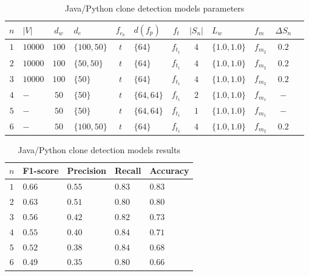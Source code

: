 \begin{table}
  \caption{\label{tab:java-python-model-params}Java/Python clone detection
    models parameters}
  \begin{center}
    \begin{tabularx}{\linewidth}{c Y c Y c Y c c Y Y c c}
      \toprule
      $n$ & $|V|$ & $d_w$ & $d_e$ & $f_{e_b}$ & $d(f_p)$ & $f_t$ & $|S_n|$ & $L_w$ & $f_m$ & $\Delta S_n$\\
      \toprule
      $1$ & $10000$ & $100$ & $\{100,50\}$ & $t$ & $\{64\}$ & $f_{t_1}$ & $4$ & $\{1.0,1.0\}$ & $f_{m_2}$ & $0.2$\\
      $2$ & $10000$ & $100$ & $\{50,50\}$ & $t$ & $\{64\}$ & $f_{t_1}$ & $4$ & $\{1.0,1.0\}$ & $f_{m_2}$ & $0.2$\\
      $3$ & $10000$ & $100$ & $\{50\}$ & $t$ & $\{64\}$ & $f_{t_1}$ & $4$ & $\{1.0,1.0\}$ & $f_{m_2}$ & $0.2$\\
      $4$ & $-$ & $50$ & $\{50\}$ & $t$ & $\{64,64\}$ & $f_{t_1}$ & $2$ & $\{1.0,1.0\}$ & $f_{m_1}$ & $-$\\
      $5$ & $-$ & $50$ & $\{50\}$ & $t$ & $\{64,64\}$ & $f_{t_1}$ & $1$ & $\{1.0,1.0\}$ & $f_{m_1}$ & $-$\\
      $6$ & $-$ & $50$ & $\{100,50\}$ & $t$ & $\{64\}$ & $f_{t_1}$ & $4$ & $\{1.0,1.0\}$ & $f_{m_2}$ & $0.2$\\
      \bottomrule
    \end{tabularx}
  \end{center}
\end{table}
%
\begin{table}
  \caption{\label{tab:java-python-model-results}Java/Python clone detection
    models results}
  \begin{center}
    \begin{tabularx}{\linewidth}{c Y Y Y Y}
      \toprule
      $n$ & F1-score & Precision & Recall & Accuracy\\
      \toprule
      $1$ & $0.66$ & $0.55$ & $0.83$ & $0.83$\\
      $2$ & $0.63$ & $0.51$ & $0.80$ & $0.80$\\
      $3$ & $0.56$ & $0.42$ & $0.82$ & $0.73$\\
      $4$ & $0.55$ & $0.40$ & $0.84$ & $0.71$\\
      $5$ & $0.52$ & $0.38$ & $0.84$ & $0.68$\\
      $6$ & $0.49$ & $0.35$ & $0.80$ & $0.66$\\
      \bottomrule
    \end{tabularx}
  \end{center}
\end{table}
